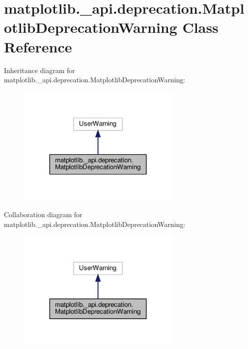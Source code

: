 \hypertarget{classmatplotlib_1_1__api_1_1deprecation_1_1MatplotlibDeprecationWarning}{}\section{matplotlib.\+\_\+api.\+deprecation.\+Matplotlib\+Deprecation\+Warning Class Reference}
\label{classmatplotlib_1_1__api_1_1deprecation_1_1MatplotlibDeprecationWarning}


Inheritance diagram for matplotlib.\+\_\+api.\+deprecation.\+Matplotlib\+Deprecation\+Warning\+:
\nopagebreak
\begin{figure}[H]
\begin{center}
\leavevmode
\includegraphics[width=227pt]{classmatplotlib_1_1__api_1_1deprecation_1_1MatplotlibDeprecationWarning__inherit__graph}
\end{center}
\end{figure}


Collaboration diagram for matplotlib.\+\_\+api.\+deprecation.\+Matplotlib\+Deprecation\+Warning\+:
\nopagebreak
\begin{figure}[H]
\begin{center}
\leavevmode
\includegraphics[width=227pt]{classmatplotlib_1_1__api_1_1deprecation_1_1MatplotlibDeprecationWarning__coll__graph}
\end{center}
\end{figure}


